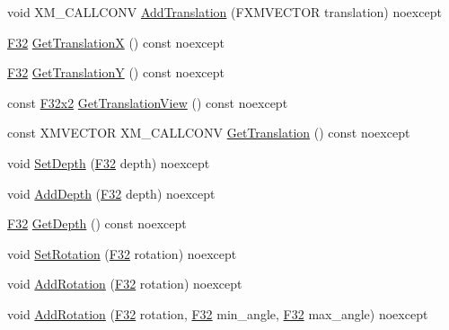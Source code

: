\begin{DoxyCompactItemize}
\item 
void X\+M\+\_\+\+C\+A\+L\+L\+C\+O\+NV \mbox{\hyperlink{classmage_1_1_sprite_transform2_d_a5fedf485e63707c1f0a2360daf46c0a4}{Add\+Translation}} (F\+X\+M\+V\+E\+C\+T\+OR translation) noexcept
\item 
\mbox{\hyperlink{namespacemage_aa97e833b45f06d60a0a9c4fc22ae02c0}{F32}} \mbox{\hyperlink{classmage_1_1_sprite_transform2_d_a9ecfb651c93a75eba822c0d9779bfb1a}{Get\+TranslationX}} () const noexcept
\item 
\mbox{\hyperlink{namespacemage_aa97e833b45f06d60a0a9c4fc22ae02c0}{F32}} \mbox{\hyperlink{classmage_1_1_sprite_transform2_d_a4c7ca12c213a432f52146bbc58d7e66a}{Get\+TranslationY}} () const noexcept
\item 
const \mbox{\hyperlink{namespacemage_aee4759dedc8def6c6dec26b5c7eddf29}{F32x2}} \mbox{\hyperlink{classmage_1_1_sprite_transform2_d_a6c881a0a0b3f6fd7e25708a29e02aa6f}{Get\+Translation\+View}} () const noexcept
\item 
const X\+M\+V\+E\+C\+T\+OR X\+M\+\_\+\+C\+A\+L\+L\+C\+O\+NV \mbox{\hyperlink{classmage_1_1_sprite_transform2_d_a2e78cd56fffdb096967c7bf78636dab2}{Get\+Translation}} () const noexcept
\item 
void \mbox{\hyperlink{classmage_1_1_sprite_transform2_d_ae2a32bea37357f2739d91efca05faaa0}{Set\+Depth}} (\mbox{\hyperlink{namespacemage_aa97e833b45f06d60a0a9c4fc22ae02c0}{F32}} depth) noexcept
\item 
void \mbox{\hyperlink{classmage_1_1_sprite_transform2_d_a38fd747ee38135b827971002a85e4f9f}{Add\+Depth}} (\mbox{\hyperlink{namespacemage_aa97e833b45f06d60a0a9c4fc22ae02c0}{F32}} depth) noexcept
\item 
\mbox{\hyperlink{namespacemage_aa97e833b45f06d60a0a9c4fc22ae02c0}{F32}} \mbox{\hyperlink{classmage_1_1_sprite_transform2_d_a44b63bd121562424086ce444da7d0312}{Get\+Depth}} () const noexcept
\item 
void \mbox{\hyperlink{classmage_1_1_sprite_transform2_d_ac1891a7e79561143e1b2bf1b25e93b40}{Set\+Rotation}} (\mbox{\hyperlink{namespacemage_aa97e833b45f06d60a0a9c4fc22ae02c0}{F32}} rotation) noexcept
\item 
void \mbox{\hyperlink{classmage_1_1_sprite_transform2_d_ab7c282aedb9bf158d82175f0cab0180e}{Add\+Rotation}} (\mbox{\hyperlink{namespacemage_aa97e833b45f06d60a0a9c4fc22ae02c0}{F32}} rotation) noexcept
\item 
void \mbox{\hyperlink{classmage_1_1_sprite_transform2_d_ad8978471956c9ef38737f46ef84b64a5}{Add\+Rotation}} (\mbox{\hyperlink{namespacemage_aa97e833b45f06d60a0a9c4fc22ae02c0}{F32}} rotation, \mbox{\hyperlink{namespacemage_aa97e833b45f06d60a0a9c4fc22ae02c0}{F32}} min\+\_\+angle, \mbox{\hyperlink{namespacemage_aa97e833b45f06d60a0a9c4fc22ae02c0}{F32}} max\+\_\+angle) noexcept

\end{DoxyCompactItemize}
